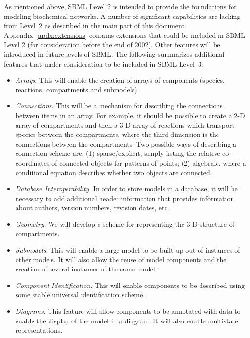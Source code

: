 \documentclass[10pt]{cekarticle}
\begin{document}
As mentioned above, SBML Level 2 is intended to provide the foundations for modeling biochemical networks.  A number of
significant capabilities are lacking from Level~2 as described in the main part of this document.  Appendix~\ref{apdx:extensions} contains extensions that could be included in SBML Level 2 (for consideration before the end of 2002). Other features will be
introduced in future levels of SBML.  The following
summarizes additional features that under consideration to be
included in SBML Level~3:
\begin{itemize}

\item \emph{Arrays}.  This will enable the creation of arrays of components
  (species, reactions, compartments and submodels).

\item \emph{Connections}.  This will be a mechanism for describing the
  connections between items in an array.  For example, it should be
  possible to create a 2-D array of compartments and then a 3-D array of
  reactions which transport species between the compartments, where the
  third dimension is the connections between the compartments.  Two
  possible ways of describing a connection scheme are: (1) sparse/explicit,
  simply listing the relative co-coordinates of connected objects for
  patterns of points; (2) algebraic, where a conditional equation describes
  whether two objects are connected.

\item \emph{Database Interoperability}.  In order to store models in a
  database, it will be necessary to add additional header information that
  provides information about authors, version numbers, revision dates, etc.

\item \emph{Geometry}.  We will develop a scheme for representing the 3-D
  structure of compartments.

\item \emph{Submodels}.  This will enable a large model to be built up out
  of instances of other models.  It will also allow the reuse of model
  components and the creation of several instances of the same model.

\item \emph{Component Identification}.  This will enable components to be
  described using some stable universal identification scheme.

\item \emph{Diagrams}.  This feature will allow components to be
annotated
  with data to enable the display of the model in a diagram.  It will also
  enable multistate representations.


\end{itemize}
\end{document}
